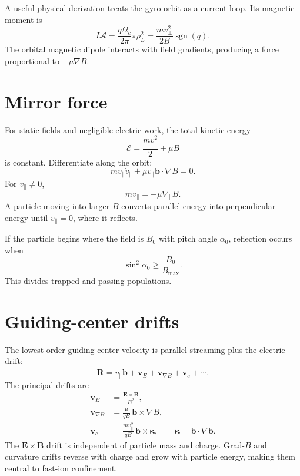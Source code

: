 \documentclass[11pt]{article}
\begin{document}
A useful physical derivation treats the gyro-orbit as a current loop. Its magnetic moment is
\begin{equation}
I\mathcal A=\frac{q\Omega_c}{2\pi}\pi\rho_L^2
=\frac{mv_\perp^2}{2B}\operatorname{sgn}(q).
\end{equation}
The orbital magnetic dipole interacts with field gradients, producing a force proportional to $-\mu\nabla B$.

\section{Mirror force}
For static fields and negligible electric work, the total kinetic energy
\begin{equation}
\mathcal E=\frac{mv_\parallel^2}{2}+\mu B
\end{equation}
is constant. Differentiate along the orbit:
\begin{equation}
m v_\parallel\dot v_\parallel+\mu v_\parallel\mathbf b\cdot\nabla B=0.
\end{equation}
For $v_\parallel\neq0$,
\begin{equation}
\boxed{m\dot v_\parallel=-\mu\nabla_\parallel B}.
\end{equation}
A particle moving into larger $B$ converts parallel energy into perpendicular energy until $v_\parallel=0$, where it reflects.

If the particle begins where the field is $B_0$ with pitch angle $\alpha_0$, reflection occurs when
\begin{equation}
\sin^2\alpha_0\ge\frac{B_0}{B_{\max}}.
\end{equation}
This divides trapped and passing populations.

\section{Guiding-center drifts}
The lowest-order guiding-center velocity is parallel streaming plus the electric drift:
\begin{equation}
\dot{\mathbf R}=v_\parallel\mathbf b+
\mathbf v_E+\mathbf v_{\nabla B}+\mathbf v_c+\cdots.
\end{equation}
The principal drifts are
\begin{align}
\mathbf v_E&=\frac{\mathbf E\times\mathbf B}{B^2},\\
\mathbf v_{\nabla B}&=\frac{\mu}{qB}\,\mathbf b\times\nabla B,\\
\mathbf v_c&=\frac{mv_\parallel^2}{qB}\,\mathbf b\times\boldsymbol\kappa,
\qquad
\boldsymbol\kappa=\mathbf b\cdot\nabla\mathbf b.
\end{align}
The $\mathbf E\times\mathbf B$ drift is independent of particle mass and charge. Grad-$B$ and curvature drifts reverse with charge and grow with particle energy, making them central to fast-ion confinement.
\end{document}
